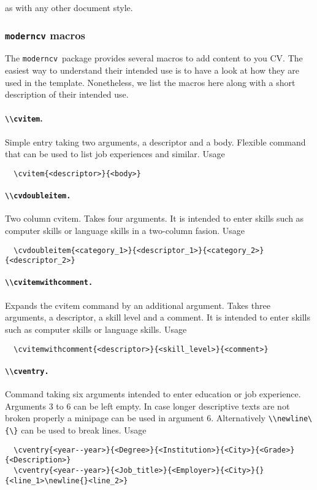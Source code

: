 \documentclass[a4paper,11pt]{article}
\newcommand{\code}[1]{\lstinline!#1!}
\newcommand{\Code}[1]{\lstinline!#1!~} %
\newcommand{\Moderncv}{\Code{moderncv}}
\begin{document}
as with any other document style.

\subsubsection{\texttt{moderncv} macros}

The \Moderncv package provides several macros to add content to you CV. The easiest way to understand their intended use is to have a look at how they are used in the template. 
Nonetheless, we list the macros here along with a short description of their intended use. 

\paragraph{\code{\\cvitem}.} Simple entry taking two arguments, a descriptor and a body. Flexible command that can be used to list job experiences and similar. Usage
\begin{lstlisting}
  \cvitem{<descriptor>}{<body>}
\end{lstlisting} 

\paragraph{\code{\\cvdoubleitem.}} Two column cvitem. Takes four arguments. It is intended to enter skills such as computer skills or language skills in a two-column fasion. Usage
\begin{lstlisting}
  \cvdoubleitem{<category_1>}{<descriptor_1>}{<category_2>}{<descriptor_2>}
\end{lstlisting} 

\paragraph{\code{\\cvitemwithcomment.}} Expands the cvitem command by an additional argument. Takes three arguments, a descriptor, a skill level  and a comment. It is intended to enter skills such as computer skills or language skills. Usage
\begin{lstlisting}
  \cvitemwithcomment{<descriptor>}{<skill_level>}{<comment>}
\end{lstlisting} 

\paragraph{\code{\\cventry.}} Command taking six arguments intended to enter education or job experience. 
Arguments 3 to 6 can be left empty. In case longer descriptive texts are not broken properly a minipage can be used in argument 6. Alternatively \code{\\newline\{\}} can be used to break lines.  Usage
\begin{lstlisting}
  \cventry{<year--year>}{<Degree>}{<Institution>}{<City>}{<Grade>}{<Description>}
  \cventry{<year--year>}{<Job_title>}{<Employer>}{<City>}{}{<line_1>\newline{}<line_2>}
\end{lstlisting} 
\end{document}
